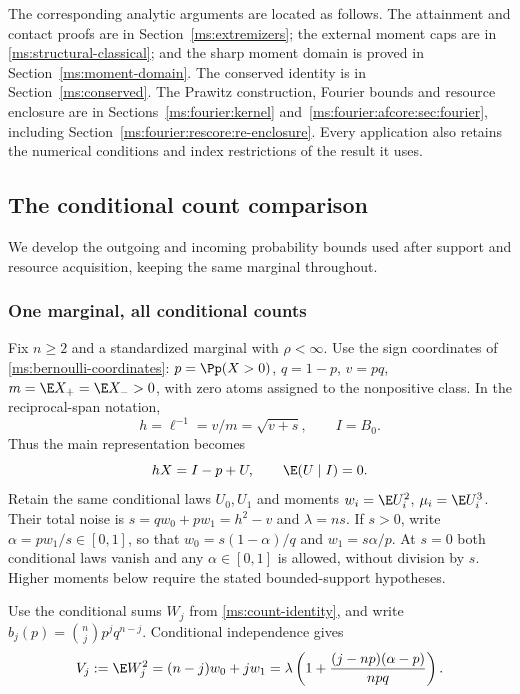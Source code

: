 The corresponding analytic arguments are located as follows. The attainment and
contact proofs are in Section~\ref{ms:extremizers}; the external moment caps
are in \eqref{ms:structural-classical}; and the sharp moment domain is proved
in Section~\ref{ms:moment-domain}. The conserved identity is in
Section~\ref{ms:conserved}. The Prawitz construction, Fourier bounds
and resource enclosure are in Sections~\ref{ms:fourier:kernel}
and~\ref{ms:fourier:afcore:sec:fourier}, including
Section~\ref{ms:fourier:rescore:re-enclosure}. Every application also retains the numerical conditions and index restrictions
of the result it uses.

\subsection{The conditional count comparison}
\label{ms:finite:countcore:sec}

We develop the outgoing and incoming probability bounds used after support
and resource acquisition, keeping the same marginal throughout.

\subsubsection{One marginal, all conditional counts}

Fix $n\ge2$ and a standardized marginal with $\rho<\infty$. Use the sign coordinates of
\eqref{ms:bernoulli-coordinates}: $p=\Pp(X>0)$, $q=1-p$, $v=pq$,
$m=\E X_+=\E X_->0$, with zero atoms assigned to the nonpositive
class. In the reciprocal-span notation,
\[
 h=\ell^{-1}=v/m=\sqrt{v+s},\qquad I=B_0.
\]
Thus the main representation becomes
\begin{equation}
 hX=I-p+U,\qquad \E(U\mid I)=0.
 \label{ms:finite:countcore:representation}
\end{equation}
Retain the same conditional laws $U_0,U_1$ and moments
$w_i=\E U_i^2$, $\mu_i=\E U_i^3$. Their total noise is
$s=qw_0+pw_1=h^2-v$ and $\lambda=ns$. If $s>0$, write
$\alpha=pw_1/s\in[0,1]$, so that
$w_0=s(1-\alpha)/q$ and $w_1=s\alpha/p$.
At $s=0$ both conditional laws vanish and any $\alpha\in[0,1]$
is allowed, without division by $s$. Higher moments below require the
stated bounded-support hypotheses.

Use the conditional sums $W_j$ from \eqref{ms:count-identity}, and write
$b_j(p)=\binom njp^jq^{n-j}$. Conditional independence gives
\begin{equation}
 V_j:=\E W_j^2=(n-j)w_0+jw_1
 =\lambda\left(1+\frac{(j-np)(\alpha-p)}{npq}\right).
 \label{ms:finite:countcore:variance}
\end{equation}

